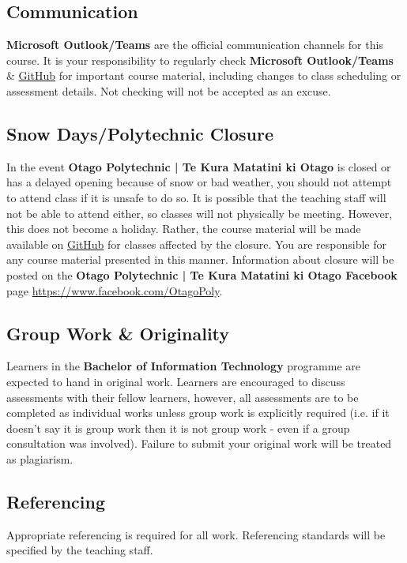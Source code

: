 \documentclass{article}
\begin{document}
\subsection*{Communication}
\textbf{Microsoft Outlook/Teams} are the official communication channels for this course. It is your responsibility to regularly check \textbf{Microsoft Outlook/Teams} \& \href{https://github.com/otago-polytechnic-bit-courses/ID630151-introduction-to-algorithmic-problem-solving}{GitHub} for important course material, including changes to class scheduling or assessment details. Not checking will not be accepted as an excuse.

\subsection*{Snow Days/Polytechnic Closure}
In the event \textbf{Otago Polytechnic | Te Kura Matatini ki Otago} is closed or has a delayed opening because of snow or bad weather, you should not attempt to attend class if it is unsafe to do so. It is possible that the teaching staff will not be able to attend either, so classes will not physically be meeting. However, this does not become a holiday. Rather, the course material will be made available on \href{https://github.com/otago-polytechnic-bit-courses/ID630151-introduction-to-algorithmic-problem-solving}{GitHub} for classes affected by the closure. You are responsible for any course material presented in this manner. Information about closure will be posted on the \textbf{Otago Polytechnic | Te Kura Matatini ki Otago Facebook} page \href{https://www.facebook.com/OtagoPoly}{https://www.facebook.com/OtagoPoly}.

\subsection*{Group Work \& Originality}
Learners in the \textbf{Bachelor of Information Technology} programme are expected to hand in original work. Learners are encouraged to discuss assessments with their fellow learners, however, all assessments are to be completed as individual works unless group work is explicitly required (i.e. if it doesn't say it is group work then it is not group work - even if a group consultation was involved). Failure to submit your original work will be treated as plagiarism.

\subsection*{Referencing}
Appropriate referencing is required for all work. Referencing standards will be specified by the teaching staff.
\end{document}
